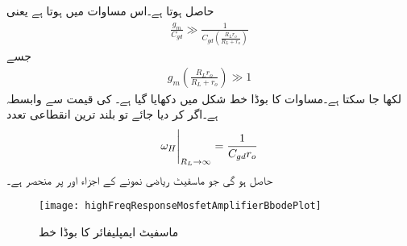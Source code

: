 حاصل ہوتا ہے۔اس مساوات میں  ہوتا ہے یعنی
\begin{align*}
\frac{g_m}{C_{gd}} \gg \frac{1}{C_{gd} \left(\frac{R_L r_o}{R_L+r_o} \right)}
\end{align*}
جسے
\begin{align}
g_m \left(\frac{R_L r_o}{R_L+r_o} \right) \gg 1
\end{align}
لکھا جا سکتا ہے۔مساوات  کا بوڈا خط شکل  میں دکھایا گیا ہے۔ کی قیمت  سے وابسطہ ہے۔اگر  کر دیا جائے تو بلند ترین انقطاعی تعدد
\begin{align}
\eval{\omega_H}_{R_L \to \infty}=\frac{1}{C_{gd} r_o}
\end{align}
حاصل ہو گی جو ماسفیٹ      ریاضی نمونے کے اجزاء  اور  پر منحصر ہے۔
\begin{figure}
\centering
\texttt{[image: highFreqResponseMosfetAmplifierBbodePlot]}
\caption{ماسفیٹ ایمپلیفائر کا بوڈا خط}
\label{شکل_تعددی_ردعمل_ماسفیٹ_بوڈا_خط}
\end{figure}

